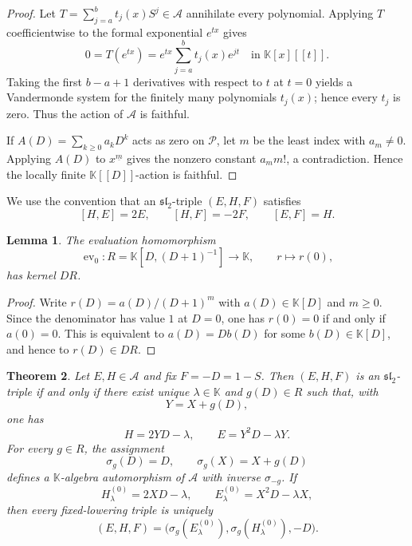 \documentclass[11pt,reqno]{amsart}
\numberwithin{equation}{section}
\newtheorem{theorem}{Theorem}[section]
\newtheorem{lemma}[theorem]{Lemma}
\theoremstyle{definition}
\theoremstyle{remark}
\newcommand{\K}{\mathbb K}
\newcommand{\algA}{\mathcal A}
\newcommand{\calP}{\mathcal P}
\newcommand{\ev}{\operatorname{ev}}
\begin{document}
\begin{proof}
Let $T=\sum_{j=a}^{b}t_j(x)S^j\in\algA$ annihilate every polynomial.  Applying $T$ coefficientwise to the formal exponential $e^{tx}$ gives
\[
 0=T(e^{tx})=e^{tx}\sum_{j=a}^{b}t_j(x)e^{jt}
 \quad\text{in }\K[x][[t]].
\]
Taking the first $b-a+1$ derivatives with respect to $t$ at $t=0$ yields a Vandermonde system for the finitely many polynomials $t_j(x)$; hence every $t_j$ is zero.  Thus the action of $\algA$ is faithful.

If $A(D)=\sum_{k\ge0}a_kD^k$ acts as zero on $\calP$, let $m$ be the least index with $a_m\ne0$.  Applying $A(D)$ to $x^{\underline m}$ gives the nonzero constant $a_m m!$, a contradiction.  Hence the locally finite $\K[[D]]$-action is faithful.
\end{proof}

We use the convention that an $\mathfrak{sl}_2$-triple $(E,H,F)$ satisfies
\begin{equation}\label{eq:sl2-relations}
 [H,E]=2E,
 \qquad
 [H,F]=-2F,
 \qquad
 [E,F]=H.
\end{equation}

\begin{lemma}\label{lem:evaluation}
The evaluation homomorphism
\[
 \ev_0:R=\K[D,(D+1)^{-1}]\longrightarrow\K,
 \qquad
 r\longmapsto r(0),
\]
has kernel $DR$.
\end{lemma}

\begin{proof}
Write $r(D)=a(D)/(D+1)^m$ with $a(D)\in\K[D]$ and $m\ge0$.  Since the denominator has value $1$ at $D=0$, one has $r(0)=0$ if and only if $a(0)=0$.  This is equivalent to $a(D)=Db(D)$ for some $b(D)\in\K[D]$, and hence to $r(D)\in DR$.
\end{proof}

\begin{theorem}\label{thm:classification}
Let $E,H\in\algA$ and fix $F=-D=1-S$.  Then $(E,H,F)$ is an $\mathfrak{sl}_2$-triple if and only if there exist unique $\lambda\in\K$ and $g(D)\in R$ such that, with
\[
 Y=X+g(D),
\]
one has
\begin{equation}\label{eq:normal-form}
 H=2YD-\lambda,
 \qquad
 E=Y^2D-\lambda Y.
\end{equation}
For every $g\in R$, the assignment
\begin{equation}\label{eq:shear-automorphism}
 \sigma_g(D)=D,
 \qquad
 \sigma_g(X)=X+g(D)
\end{equation}
defines a $\K$-algebra automorphism of $\algA$ with inverse $\sigma_{-g}$.  If
\[
 H^{(0)}_\lambda=2XD-\lambda,
 \qquad
 E^{(0)}_\lambda=X^2D-\lambda X,
\]
then every fixed-lowering triple is uniquely
\[
 (E,H,F)=\bigl(\sigma_g(E^{(0)}_\lambda),
 \sigma_g(H^{(0)}_\lambda),-D\bigr).
\]
\end{theorem}
\end{document}
